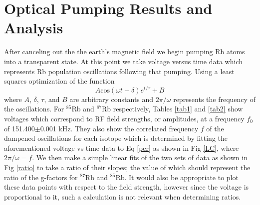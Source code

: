 \documentclass[prb,preprint]{revtex4-1}
\begin{document}
\section{Optical Pumping Results and Analysis}

After canceling out the the earth's magnetic field we begin pumping Rb atoms into a transparent state. At this point we take voltage versus time data which represents Rb population oscillations following that pumping. Using a least squares optimization of the function
\begin{equation}\label{per}
A\text{cos}(\omega t+\delta)e^{t/\tau}+B
\end{equation}
where $A$, $\delta$, $\tau$, and $B$ are arbitrary constants and $2\pi/\omega$ represents the frequency of the oscillations. For $^{85}$Rb and $^{87}$Rb respectively, Tables \ref{tab1} and \ref{tab2} show voltages which correspond to RF field strengths, or amplitudes, at a frequency $f_0$ of 151.400$\pm$0.001 kHz. They also show the correlated frequency $f$ of the dampened oscillations for each isotope which is determined by fitting the aforementioned voltage vs time data to Eq \eqref{per} as shown in Fig \ref{LC}, where $2\pi/\omega=f$. We then make a simple linear fits of the two sets of data as shown in Fig \ref{ratio} to take a ratio of their slopes; the value of which should represent the ratio of the g-factors for $^{87}$Rb and $^{85}$Rb. It would also be appropriate to plot these data points with respect to the field strength, however since the voltage is proportional to it, such a calculation is not relevant when determining ratios.
\end{document}
